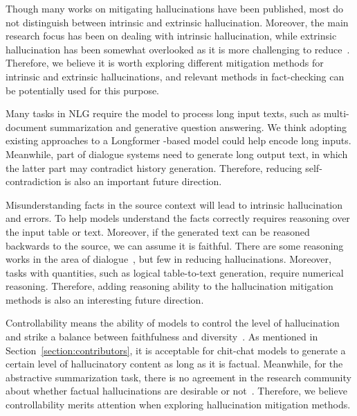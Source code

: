 Though many works on mitigating hallucinations have been published, most do not distinguish between intrinsic and extrinsic hallucination. Moreover, the main research focus has been on dealing with intrinsic hallucination, while extrinsic hallucination has been somewhat overlooked as it is more challenging to reduce~. Therefore, we believe it is worth exploring different mitigation methods for intrinsic and extrinsic hallucinations, and relevant methods in fact-checking can be potentially used for this purpose.

Many tasks in NLG require the model to process long input texts, such as multi-document summarization and generative question answering. We think adopting existing approaches to a Longformer -based model could help encode long inputs. Meanwhile, part of dialogue systems need to generate long output text, in which the latter part may contradict history generation. Therefore, reducing self-contradiction is also an important future direction.

Misunderstanding facts in the source context will lead to intrinsic hallucination and errors. To help models understand the facts correctly requires reasoning over the input table or text. Moreover, if the generated text can be reasoned backwards to the source, we can assume it is faithful. There are some reasoning works in the area of dialogue~, but few in reducing hallucinations. Moreover, tasks with quantities, such as logical table-to-text generation, require numerical reasoning. Therefore, adding reasoning ability to the hallucination mitigation methods is also an interesting future direction.

Controllability means the ability of models to control the level of hallucination and strike a balance between faithfulness and diversity~. As mentioned in Section~\ref{section:contributors}, it is acceptable for chit-chat models to generate a certain level of hallucinatory content as long as it is factual. Meanwhile, for the abstractive summarization task, there is no agreement in the research community about whether factual hallucinations are desirable or not~.
Therefore, we believe controllability merits attention when exploring hallucination mitigation methods.


